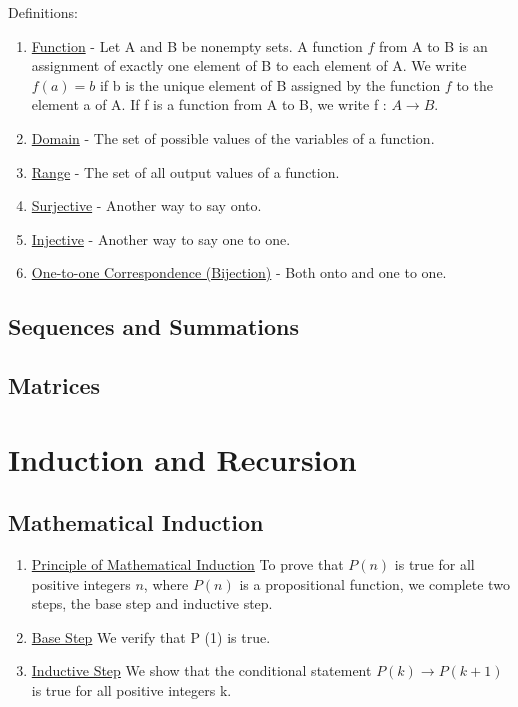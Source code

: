 \documentclass[12pt]{article}
\begin{document}
Definitions:
\begin{enumerate}

\item \underline{Function} - Let A and B be nonempty sets. A function $f$ from A to B is an assignment of exactly one element of B to each element of A. We write $f(a) = b$ if b is the unique element of B assigned by the function $f$ to the element a of A. If f is a function from A to B, we write f : $A \rightarrow B$.
\item \underline{Domain} - The set of possible values of the variables of a function.
\item \underline{Range} - The set of all output values of a function.
\item \underline{Surjective} - Another way to say onto.
\item \underline{Injective} - Another way to say one to one.
\item \underline{One-to-one Correspondence (Bijection)} - Both onto and one to one.
\end{enumerate}

\subsection{Sequences and Summations}
\subsection{Matrices}

\section{Induction and Recursion}

\subsection{Mathematical Induction}

\begin{enumerate}
\item \underline{Principle of Mathematical Induction} To prove that $P(n)$ is true for all positive integers $n$, where $P(n)$ is a propositional function, we complete two steps, the base step and inductive step.
\item \underline{Base Step} We verify that P (1) is true.
\item \underline{Inductive Step} We show that the conditional statement $P(k) \rightarrow P(k + 1)$ is true for all positive integers k.
\end{enumerate}
\end{document}
